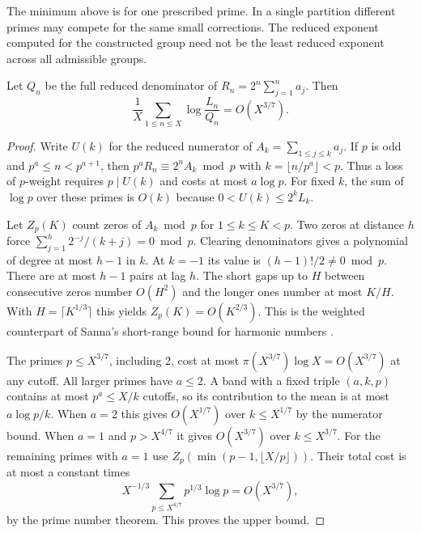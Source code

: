 \documentclass[11pt]{article}
\begin{document}
The minimum above is for one prescribed prime. In a single partition different primes may compete for the same small corrections. The reduced exponent computed for the constructed group need not be the least reduced exponent across all admissible groups.

\begin{proposition}\label{prop:meanloss}
Let $Q_n$ be the full reduced denominator of $R_n=2^n\sum_{j=1}^n a_j$. Then
\[
 \frac1X\sum_{1\le n\le X}\log\frac{L_n}{Q_n}=O(X^{3/7}).
\]
\end{proposition}
\begin{proof}
Write $U(k)$ for the reduced numerator of $A_k=\sum_{1\le j\le k}a_j$. If $p$ is odd and $p^a\le n<p^{a+1}$, then $p^a R_n\equiv 2^n A_k\bmod p$ with $k=\lfloor n/p^a\rfloor<p$. Thus a loss of $p$-weight requires $p\mid U(k)$ and costs at most $a\log p$. For fixed $k$, the sum of $\log p$ over these primes is $O(k)$ because $0<U(k)\le2^k L_k$.

Let $Z_p(K)$ count zeros of $A_k\bmod p$ for $1\le k\le K<p$. Two zeros at distance $h$ force $\sum_{j=1}^h 2^{-j}/(k+j)=0\bmod p$. Clearing denominators gives a polynomial of degree at most $h-1$ in $k$. At $k=-1$ its value is $(h-1)!/2\ne0\bmod p$. There are at most $h-1$ pairs at lag $h$. The short gaps up to $H$ between consecutive zeros number $O(H^2)$ and the longer ones number at most $K/H$. With $H=\lceil K^{1/3}\rceil$ this yields $Z_p(K)=O(K^{2/3})$. This is the weighted counterpart of Sanna's short-range bound for harmonic numbers \cite[Lemma~2.2]{sanna}.

The primes $p\le X^{3/7}$, including 2, cost at most $\pi(X^{3/7})\log X=O(X^{3/7})$ at any cutoff. All larger primes have $a\le2$. A band with a fixed triple $(a,k,p)$ contains at most $p^a\le X/k$ cutoffs, so its contribution to the mean is at most $a\log p/k$. When $a=2$ this gives $O(X^{1/7})$ over $k\le X^{1/7}$ by the numerator bound. When $a=1$ and $p>X^{4/7}$ it gives $O(X^{3/7})$ over $k\le X^{3/7}$. For the remaining primes with $a=1$ use $Z_p(\min(p-1,\lfloor X/p\rfloor))$. Their total cost is at most a constant times
\[
 X^{-1/3}\sum_{p\le X^{4/7}}p^{1/3}\log p=O(X^{3/7}),
\]
by the prime number theorem. This proves the upper bound.
\end{proof}
\end{document}
